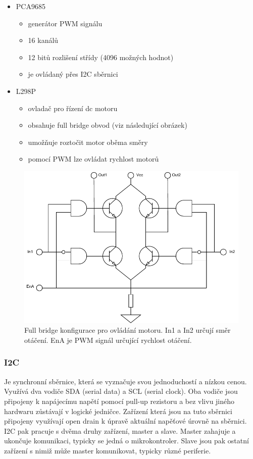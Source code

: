 \begin{itemize}
	\item{PCA9685 \cite{pca9685}}
	\begin{itemize}
		\item{generátor PWM signálu}
		\item{16 kanálů}
		\item{12 bitů rozlišení střídy (4096 možných hodnot)}
		\item{je ovládaný přes I2C sběrnici}
	\end{itemize}
	\item{L298P}
	\begin{itemize}
		\item{ovladač pro řízení dc motoru}
		\item{obsahuje full bridge obvod (viz následující obrázek)}
		\item{umožňuje roztočit motor oběma směry}
		\item{pomocí PWM lze ovládat rychlost motorů}
	\end{itemize}
\end{itemize}

\begin{figure}[h!]
	\centering
	\includegraphics[scale=0.75]{obrazky-figures/motor_full_bridge.pdf}
	\caption{Full bridge konfigurace pro ovládání motoru. In1 a In2 určují směr otáčení. EnA je PWM signál určující rychlost otáčení. \cite{l298}}
	\label{}
\end{figure}


\subsubsection{I2C}
Je synchronní sběrnice, která se vyznačuje svou jednoduchostí a nízkou cenou. Využívá dva vodiče SDA (serial data) a SCL (serial clock). Oba vodiče jsou připojeny k napájecímu napětí pomocí pull-up rezistoru a bez vlivu jiného hardwaru zůstávají v logické jedničce. Zařízení která jsou na tuto sběrnici připojeny využívají open drain k úpravě aktuální napěťové úrovně na sběrnici. I2C pak pracuje s dvěma druhy zařízení, master a slave. Master zahajuje a ukončuje komunikaci, typicky se jedná o mikrokontroler. Slave jsou pak ostatní zařízení s nimiž může master komunikovat, typicky různé periferie. \cite{um10204}

